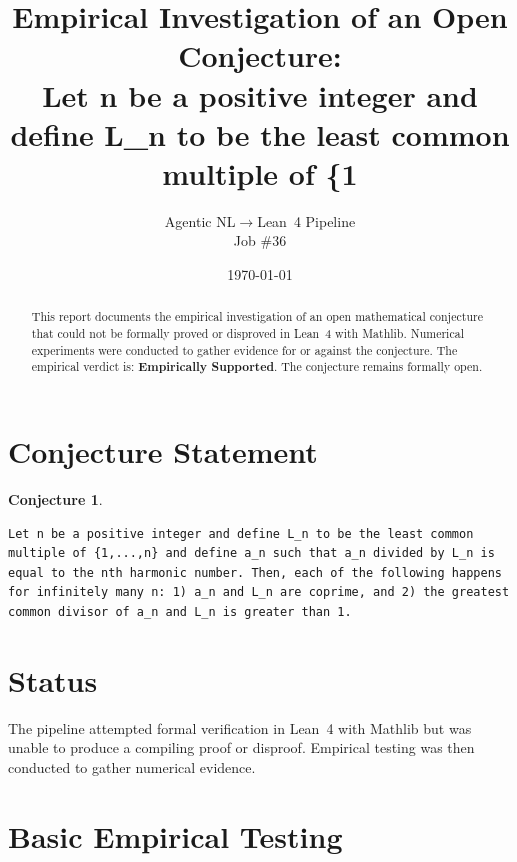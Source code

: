 \documentclass[11pt]{article}
\title{Empirical Investigation of an Open Conjecture:\\
Let n be a positive integer and define L\_n to be the least common multiple of \{1}
\author{Agentic NL$\to$Lean~4 Pipeline \\ \small Job \#36}
\date{\today}
\newtheorem{conjecture}{Conjecture}
\begin{document}
\maketitle

\begin{abstract}
This report documents the empirical investigation of an open mathematical conjecture
that could not be formally proved or disproved in Lean~4 with Mathlib.
Numerical experiments were conducted to gather evidence for or against the conjecture.
The empirical verdict is: \textbf{\textcolor{green!70!black}{Empirically Supported}}.
The conjecture remains formally open.
\end{abstract}

\section{Conjecture Statement}

\begin{conjecture}
\begin{lstlisting}
Let n be a positive integer and define L_n to be the least common multiple of {1,...,n} and define a_n such that a_n divided by L_n is equal to the nth harmonic number. Then, each of the following happens for infinitely many n: 1) a_n and L_n are coprime, and 2) the greatest common divisor of a_n and L_n is greater than 1.
\end{lstlisting}
\end{conjecture}

\section{Status}

\begin{center}
\end{center}

The pipeline attempted formal verification in Lean~4 with Mathlib but was unable to
produce a compiling proof or disproof. Empirical testing was then conducted to gather
numerical evidence.

\section{Basic Empirical Testing}
\end{document}
